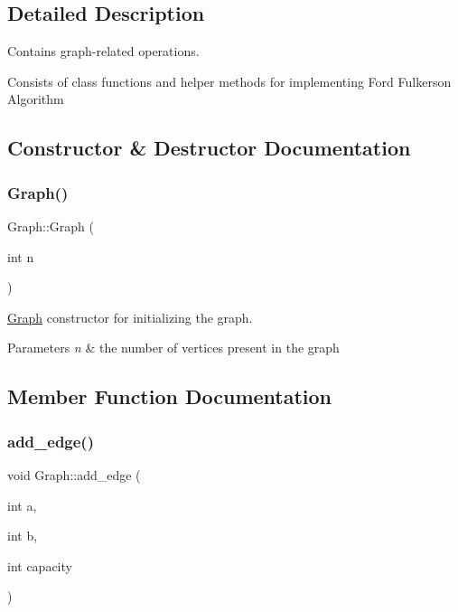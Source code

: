 \subsection{Detailed Description}
Contains graph-\/related operations. 

Consists of class functions and helper methods for implementing Ford Fulkerson Algorithm 

\subsection{Constructor \& Destructor Documentation}
\mbox{\label{classGraph_a7b14c9bc0b5fbf50165aaf92f4aeef1d}} 
\subsubsection{\texorpdfstring{Graph()}{Graph()}}
{\footnotesize\ttfamily Graph\+::\+Graph (\begin{DoxyParamCaption}\item[{int}]{n }\end{DoxyParamCaption})\hspace{0.3cm}{\ttfamily [inline]}}



\hyperlink{classGraph}{Graph} constructor for initializing the graph. 


\begin{DoxyParams}{Parameters}
{\em n} & the number of vertices present in the graph \\
\hline
\end{DoxyParams}


\subsection{Member Function Documentation}
\mbox{\label{classGraph_a232e50e0a5670ca9bc18127852996cd9}} 
\subsubsection{\texorpdfstring{add\+\_\+edge()}{add\_edge()}}
{\footnotesize\ttfamily void Graph\+::add\+\_\+edge (\begin{DoxyParamCaption}\item[{int}]{a,  }\item[{int}]{b,  }\item[{int}]{capacity }\end{DoxyParamCaption})\hspace{0.3cm}{\ttfamily [inline]}}



